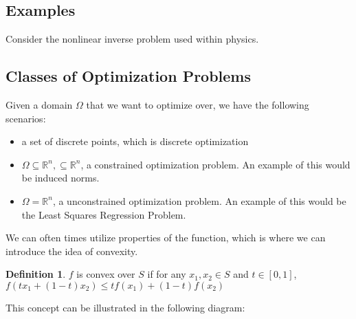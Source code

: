 \documentclass[11pt]{article}
\theoremstyle{definition}
\newtheorem{definition}{Definition}[section]
\newcommand{\R}{\mathbb{R}}
\begin{document}
\subsection{Examples}
Consider the nonlinear inverse problem used within physics. 
\subsection{Classes of Optimization Problems}
Given a domain $\Omega$ that we want to optimize over, we have the following scenarios:
\begin{itemize}
  \item a set of discrete points, which is discrete optimization
  \item $\Omega \subseteq \R^n, \subseteq \R^n$, a constrained optimization problem. An example of this would be induced norms. 
  \item $\Omega = \R^n$, a unconstrained optimization problem. An example of this would be the Least Squares Regression Problem. 
\end{itemize}
We can often times utilize properties of the function, which is where we can introduce the idea of convexity. 
\begin{definition}
  $f$ is convex over $S$ if for any $x_1, x_2 \in S$ and $t \in [0,1]$, $f(tx_1 + (1-t)x_2) \leq tf(x_1) + (1-t)f(x_2)$
\end{definition}
This concept can be illustrated in the following diagram:
\begin{center}
\end{center}
\end{document}
